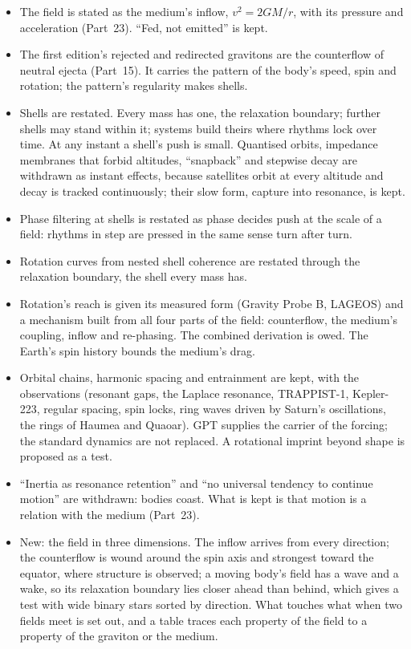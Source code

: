\documentclass[11pt,a4paper]{article}
\begin{document}
\begin{itemize}
\item The field is stated as the medium's inflow, $v^2 = 2GM/r$, with its pressure and acceleration (Part~23). ``Fed, not emitted'' is kept.
\item The first edition's rejected and redirected gravitons are the counterflow of neutral ejecta (Part~15). It carries the pattern of the body's speed, spin and rotation; the pattern's regularity makes shells.
\item Shells are restated. Every mass has one, the relaxation boundary; further shells may stand within it; systems build theirs where rhythms lock over time. At any instant a shell's push is small. Quantised orbits, impedance membranes that forbid altitudes, ``snapback'' and stepwise decay are withdrawn as instant effects, because satellites orbit at every altitude and decay is tracked continuously; their slow form, capture into resonance, is kept.
\item Phase filtering at shells is restated as phase decides push at the scale of a field: rhythms in step are pressed in the same sense turn after turn.
\item Rotation curves from nested shell coherence are restated through the relaxation boundary, the shell every mass has.
\item Rotation's reach is given its measured form (Gravity Probe B, LAGEOS) and a mechanism built from all four parts of the field: counterflow, the medium's coupling, inflow and re-phasing. The combined derivation is owed. The Earth's spin history bounds the medium's drag.
\item Orbital chains, harmonic spacing and entrainment are kept, with the observations (resonant gaps, the Laplace resonance, TRAPPIST-1, Kepler-223, regular spacing, spin locks, ring waves driven by Saturn's oscillations, the rings of Haumea and Quaoar). GPT supplies the carrier of the forcing; the standard dynamics are not replaced. A rotational imprint beyond shape is proposed as a test.
\item ``Inertia as resonance retention'' and ``no universal tendency to continue motion'' are withdrawn: bodies coast. What is kept is that motion is a relation with the medium (Part~23).
\item New: the field in three dimensions. The inflow arrives from every direction; the counterflow is wound around the spin axis and strongest toward the equator, where structure is observed; a moving body's field has a wave and a wake, so its relaxation boundary lies closer ahead than behind, which gives a test with wide binary stars sorted by direction. What touches what when two fields meet is set out, and a table traces each property of the field to a property of the graviton or the medium.

\end{itemize}
\end{document}
